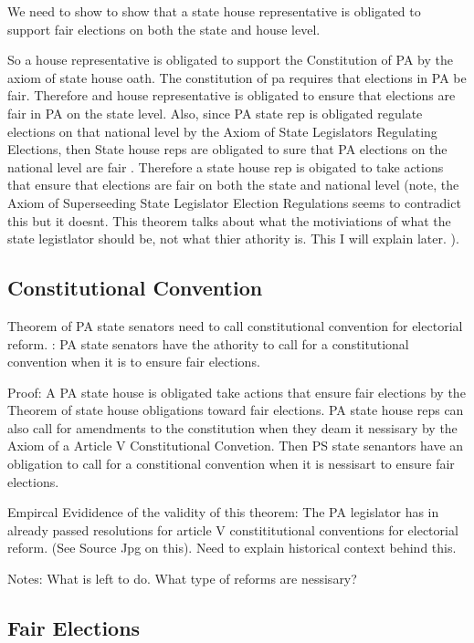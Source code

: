 \documentclass[11pt]{article} %
\begin{document}
\begin{enumerate}
We need to show to show that a state house representative is obligated to support fair elections on both the state and house level. 

So a house representative is obligated to support the Constitution of PA by the axiom of state house oath.  The constitution of pa requires that elections in PA be fair.  Therefore and house representative is obligated to ensure that elections are fair in PA on the state level.  Also, since PA state rep is obligated regulate elections on that national level by the Axiom of State Legislators Regulating Elections, then State house reps are obligated to sure that PA elections on the national level are fair . Therefore a state house rep is obigated to take actions that ensure that elections are fair on both the state and national level (note, the Axiom of Superseeding State Legislator Election Regulations seems to contradict this but it doesnt.  This theorem talks about what the motiviations of what the state legistlator should be, not what thier athority is.  This I will explain later. ). 


\subsection{Constitutional Convention}

Theorem of  PA state senators need to call constitutional convention for electorial reform. : PA state senators have the athority to call for a constitutional convention when it is to ensure fair elections.

Proof:  A PA state house is obligated take actions that ensure fair elections by the Theorem of state house obligations toward fair elections.  PA state house reps can also call for amendments to the constitution when they deam it nessisary by the Axiom of a Article V Constitutional Convetion.  Then PS state senantors have an obligation to call for a constitional convention when it is nessisart to ensure fair elections. 

Empircal Evididence of the validity of this theorem:   The PA legislator has in already passed resolutions for article V constititutional conventions for electorial reform.   (See Source Jpg on this).   Need to explain historical context behind this. 



Notes: What is left to do.  What type of reforms are nessisary?  

\subsection{Fair Elections}


\end{enumerate}
\end{document}
